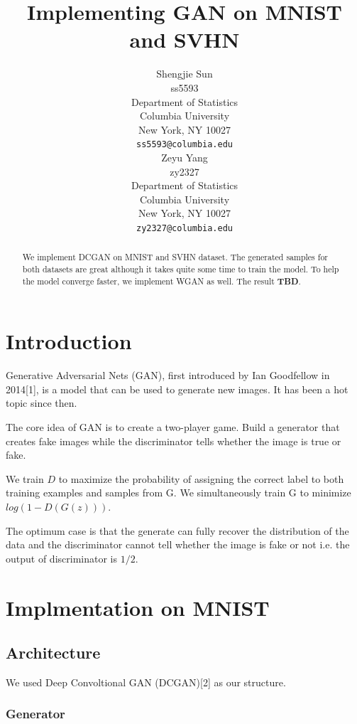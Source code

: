 \documentclass{article}
\title{Implementing GAN on MNIST and SVHN}
\author{%
  Shengjie Sun \\
  ss5593\\
  Department of Statistics\\
  Columbia University\\
  New York, NY 10027 \\
  \texttt{ss5593@columbia.edu} \\
  \And
  Zeyu Yang \\
  zy2327 \\
  Department of Statistics\\
  Columbia University\\
  New York, NY 10027 \\
  \texttt{zy2327@columbia.edu}
}
\begin{document}
\maketitle

\begin{abstract}
  We implement DCGAN on MNIST and SVHN dataset.
  The generated samples for both datasets are great although it takes quite some time to train the model.
  To help the model converge faster, we implement WGAN as well.
  The result \textbf{TBD}.
\end{abstract}

\section{Introduction}

Generative Adversarial Nets (GAN), first introduced by Ian Goodfellow in 2014[1], is a model that can be used to generate new images. 
It has been a hot topic since then.

The core idea of GAN is to create a two-player game. 
Build a generator that creates fake images while the discriminator tells whether the image is true or fake.

We train $D$ to maximize the probability of assigning the
correct label to both training examples and samples from G. 
We simultaneously train G to minimize $log(1-D(G(z)))$.

The optimum case is that the generate can fully recover the distribution of the data and the discriminator cannot tell whether the image is fake or not i.e. the output of discriminator is $1/2$.

\section{Implmentation on MNIST}

\subsection{Architecture}

We used Deep Convoltional GAN (DCGAN)[2] as our structure.

\subsubsection{Generator}
\end{document}
